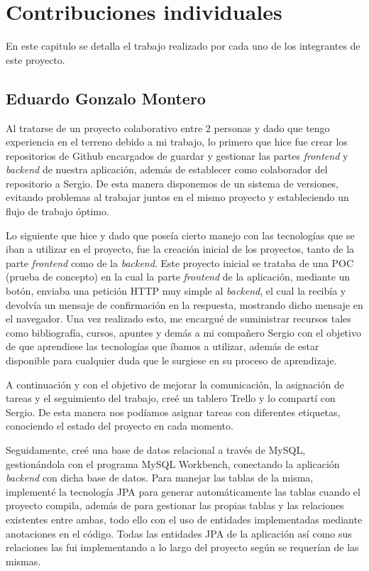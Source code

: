 \chapter{Contribuciones individuales}

En este capitulo se detalla el trabajo realizado por cada uno de los integrantes de este proyecto.

\section{Eduardo Gonzalo Montero}

Al tratarse de un proyecto colaborativo entre 2 personas y dado que tengo experiencia en el terreno debido a mi trabajo, lo primero que hice fue crear los repositorios de Github encargados de guardar y gestionar las partes \textit{frontend} y \textit{backend} de nuestra aplicación, además de establecer como colaborador del repositorio a Sergio. De esta manera disponemos de un sistema de versiones, evitando problemas al trabajar juntos en el mismo proyecto y estableciendo un flujo de trabajo óptimo. \newline

Lo siguiente que hice y dado que poseía cierto manejo con las tecnologías que se iban a utilizar en el proyecto, fue la creación inicial de los proyectos, tanto de la parte \textit{frontend} como de la  \textit{backend}. Este proyecto inicial se trataba de una POC (prueba de concepto) en la cual la parte \textit{frontend} de la aplicación, mediante un botón, enviaba una petición HTTP muy simple al \textit{backend}, el cual la recibía y devolvía un mensaje de confirmación en la respuesta, mostrando dicho mensaje en el navegador. Una vez realizado esto, me encargué de suministrar recursos tales como bibliografía, cursos, apuntes y demás a mi compañero Sergio con el objetivo de que aprendiese las tecnologías que íbamos a utilizar, además de estar disponible para cualquier duda que le surgiese en su proceso de aprendizaje. \newline

A continuación y con el objetivo de mejorar la comunicación, la asignación de tareas y el seguimiento del trabajo, creé un tablero Trello y lo compartí con Sergio. De esta manera nos podíamos asignar tareas con diferentes etiquetas, conociendo el estado del proyecto en cada momento. \newline

Seguidamente, creé una base de datos relacional a través de MySQL, gestionándola con el programa MySQL Workbench, conectando la aplicación \textit{backend} con dicha base de datos. Para manejar las tablas de la misma, implementé la tecnología JPA para generar automáticamente las tablas cuando el proyecto compila, además de para gestionar las propias tablas y las relaciones existentes entre ambas, todo ello con el uso de  entidades implementadas mediante anotaciones en el código. Todas las entidades JPA de la aplicación así como sus relaciones las fui implementando a lo largo del proyecto según se requerían de las mismas. \newline

